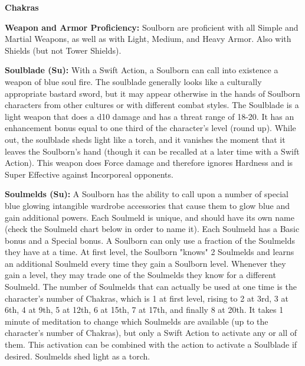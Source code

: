 \begin{extraclasstable}{\textbf{Chakras}}
\end{extraclasstable}

\classfeatures

\textbf{Weapon and Armor Proficiency:} Soulborn are proficient with all Simple and Martial Weapons, as well as with Light, Medium, and Heavy Armor. Also with Shields (but not Tower Shields).

\textbf{Soulblade (Su):} With a Swift Action, a Soulborn can call into existence a weapon of blue soul fire. The soulblade generally looks like a culturally appropriate bastard sword, but it may appear otherwise in the hands of Soulborn characters from other cultures or with different combat styles. The Soulblade is a light weapon that does a d10 damage and has a threat range of 18-20. It has an enhancement bonus equal to one third of the character's level (round up). While out, the soulblade sheds light like a torch, and it vanishes the moment that it leaves the Soulborn's hand (though it can be recalled at a later time with a Swift Action). This weapon does Force damage and therefore ignores Hardness and is Super Effective against Incorporeal opponents.

\textbf{Soulmelds (Su):} A Soulborn has the ability to call upon a number of special blue glowing intangible wardrobe accessories that cause them to glow blue and gain additional powers. Each Soulmeld is unique, and should have its own name (check the Soulmeld chart below in order to name it). Each Soulmeld has a Basic bonus and a Special bonus. A Soulborn can only use a fraction of the Soulmelds they have at a time. At first level, the Soulborn "knows" 2 Soulmelds and learns an additional Soulmeld every time they gain a Soulborn level. Whenever they gain a level, they may trade one of the Soulmelds they know for a different Soulmeld. The number of Soulmelds that can actually be used at one time is the character's number of Chakras, which is 1 at first level, rising to 2 at 3rd, 3 at 6th, 4 at 9th, 5 at 12th, 6 at 15th, 7 at 17th, and finally 8 at 20th. It takes 1 minute of meditation to change which Soulmelds are available (up to the character's number of Chakras), but only a Swift Action to activate any or all of them. This activation can be combined with the action to activate a Soulblade if desired. Soulmelds shed light as a torch.

